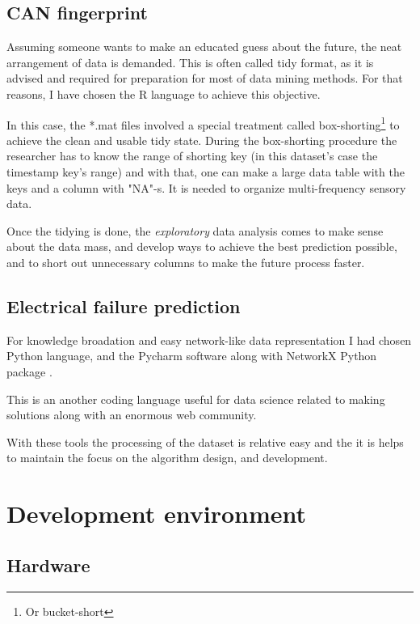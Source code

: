		\subsection{CAN fingerprint}
Assuming someone wants to make an educated guess about the future, the neat arrangement of data is demanded. This is often called tidy format, as it is advised and required for preparation for most of data mining methods. For that reasons, I have chosen the R language to achieve this objective.

In this case, the *.mat files involved a special treatment called box-shorting\footnote{Or bucket-short} \cite{Bucketshort} to achieve the clean and usable tidy state. During the box-shorting procedure the researcher has to know the range of shorting key (in this dataset's case the timestamp key's range) and with that, one can make a large data table with the keys and a column with "NA"-s. It is needed to organize multi-frequency sensory data.

Once the tidying is done, the \textit{exploratory} data analysis comes to make sense about the data mass, and develop ways to achieve the best prediction possible, and to short out unnecessary columns to make the future process faster.
		\subsection{Electrical failure prediction}
For knowledge broadation and easy network-like data representation I had chosen Python language, and the Pycharm software \cite{PyCharm} along with NetworkX Python package \cite{NetworkX}.

This is an another coding language useful for data science related to making solutions along with an enormous web community. 

With these tools the processing of the dataset is relative easy and the it is helps to maintain the focus on the algorithm design, and development.
	\section{Development environment}
		\subsection{Hardware}
